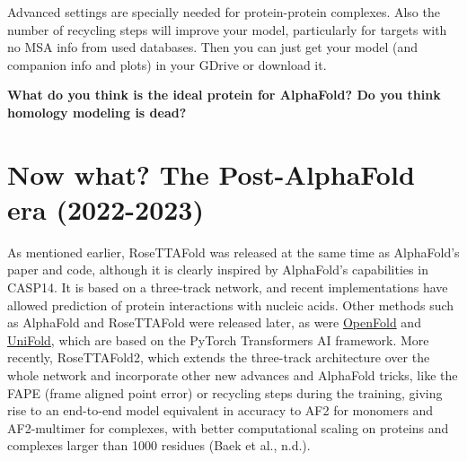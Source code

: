 \documentclass[
]{scrbook}
\begin{document}
Advanced settings are specially needed for protein-protein complexes.
Also the number of recycling steps will improve your model, particularly
for targets with no MSA info from used databases. Then you can just get
your model (and companion info and plots) in your GDrive or download it.

{\textbf{What do you think is the ideal protein for AlphaFold? Do you
think homology modeling is dead?}}

\section{Now what? The Post-AlphaFold era
(2022-2023)}\label{now-what-the-post-alphafold-era-2022-2023}

As mentioned earlier, RoseTTAFold was released at the same time as
AlphaFold's paper and code, although it is clearly inspired by
AlphaFold's capabilities in CASP14. It is based on a three-track
network, and recent implementations have allowed prediction of protein
interactions with nucleic acids. Other methods such as AlphaFold and
RoseTTAFold were released later, as were
\href{https://openfold.io/}{OpenFold} and
\href{https://colab.research.google.com/github/dptech-corp/Uni-Fold/blob/main/notebooks/unifold.ipynb}{UniFold},
which are based on the PyTorch Transformers AI framework. More recently,
RoseTTAFold2, which extends the three-track architecture over the whole
network and incorporate other new advances and AlphaFold tricks, like
the FAPE (frame aligned point error) or recycling steps during the
training, giving rise to an end-to-end model equivalent in accuracy to
AF2 for monomers and AF2-multimer for complexes, with better
computational scaling on proteins and complexes larger than 1000
residues (Baek et al., n.d.).
\end{document}
